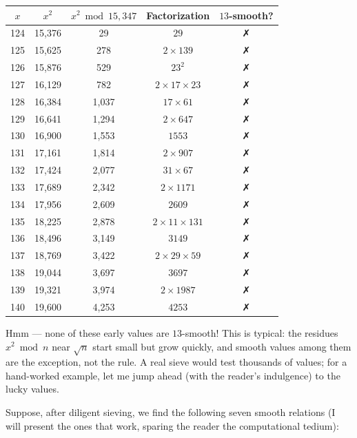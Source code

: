 \begin{center}
\small
\begin{tabular}{c c c c c}
\toprule
$x$ & $x^2$ & $x^2 \bmod 15{,}347$ & Factorization & $13$-smooth? \\
\midrule
124 & 15,376 & 29 & $29$ & ✗ \\
125 & 15,625 & 278 & $2 \times 139$ & ✗ \\
126 & 15,876 & 529 & $23^2$ & ✗ \\
127 & 16,129 & 782 & $2 \times 17 \times 23$ & ✗ \\
128 & 16,384 & 1,037 & $17 \times 61$ & ✗ \\
129 & 16,641 & 1,294 & $2 \times 647$ & ✗ \\
130 & 16,900 & 1,553 & $1553$ & ✗ \\
131 & 17,161 & 1,814 & $2 \times 907$ & ✗ \\
132 & 17,424 & 2,077 & $31 \times 67$ & ✗ \\
133 & 17,689 & 2,342 & $2 \times 1171$ & ✗ \\
134 & 17,956 & 2,609 & $2609$ & ✗ \\
135 & 18,225 & 2,878 & $2 \times 11 \times 131$ & ✗ \\
136 & 18,496 & 3,149 & $3149$ & ✗ \\
137 & 18,769 & 3,422 & $2 \times 29 \times 59$ & ✗ \\
138 & 19,044 & 3,697 & $3697$ & ✗ \\
139 & 19,321 & 3,974 & $2 \times 1987$ & ✗ \\
140 & 19,600 & 4,253 & $4253$ & ✗ \\
\bottomrule
\end{tabular}
\end{center}

Hmm --- none of these early values are $13$-smooth! This is typical: the residues $x^2 \bmod n$ near $\sqrt{n}$ start small but grow quickly, and smooth values among them are the exception, not the rule. A real sieve would test thousands of values; for a hand-worked example, let me jump ahead (with the reader's indulgence) to the lucky values.

Suppose, after diligent sieving, we find the following seven smooth relations (I will present the ones that work, sparing the reader the computational tedium):


